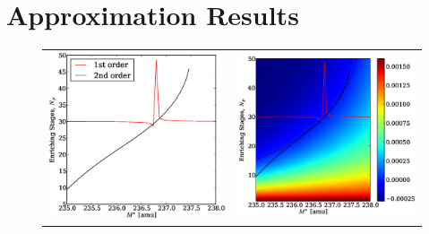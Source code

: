 \documentclass{ansconf}
\begin{document}
\section{Approximation Results}
\label{sec:aproxres}

\begin{figure}[htpb]
\begin{center}
\begin{tabular}{cc}
\includegraphics[scale=0.375]{np_closed.eps} & 
                                \includegraphics[scale=0.375]{np_closed_overlay.eps} \\

\end{tabular}
\end{center}
\end{figure}
\end{document}
